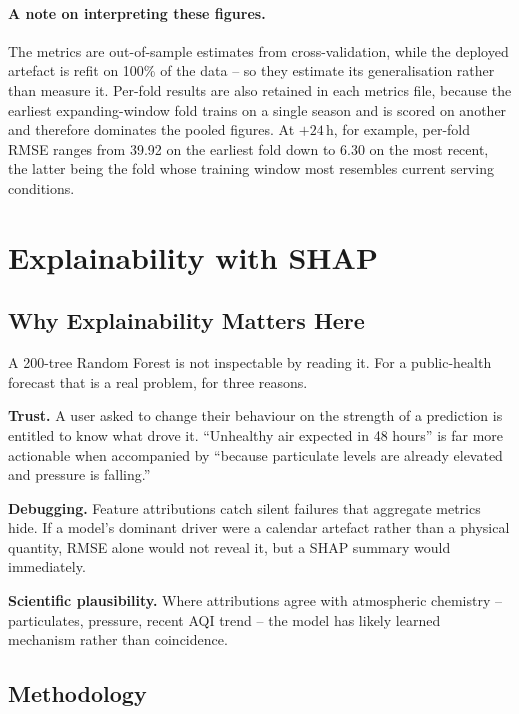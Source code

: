 \documentclass[11pt,a4paper]{article}
\begin{document}
\paragraph{A note on interpreting these figures.}
The metrics are out-of-sample estimates from cross-validation, while the
deployed artefact is refit on 100\% of the data -- so they estimate its
generalisation rather than measure it. Per-fold results are also retained in
each metrics file, because the earliest expanding-window fold trains on a
single season and is scored on another and therefore dominates the pooled
figures. At $+24$\,h, for example, per-fold RMSE ranges from 39.92 on the
earliest fold down to 6.30 on the most recent, the latter being the fold whose
training window most resembles current serving conditions.

\section{Explainability with SHAP}

\subsection{Why Explainability Matters Here}

A 200-tree Random Forest is not inspectable by reading it. For a public-health
forecast that is a real problem, for three reasons.

\textbf{Trust.} A user asked to change their behaviour on the strength of a
prediction is entitled to know what drove it. ``Unhealthy air expected in 48
hours'' is far more actionable when accompanied by ``because particulate levels
are already elevated and pressure is falling.''

\textbf{Debugging.} Feature attributions catch silent failures that aggregate
metrics hide. If a model's dominant driver were a calendar artefact rather than
a physical quantity, RMSE alone would not reveal it, but a SHAP summary would
immediately.

\textbf{Scientific plausibility.} Where attributions agree with atmospheric
chemistry -- particulates, pressure, recent AQI trend -- the model has likely
learned mechanism rather than coincidence.

\subsection{Methodology}
\end{document}
